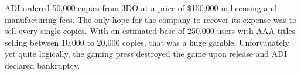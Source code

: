 ADI ordered 50,000 copies from 3DO at a price of \$150,000 in licensing and manufacturing fees. The only hope for the company to recover its expense was to sell every single copies. With an estimated base of 250,000 users with AAA titles selling between 10,000 to 20,000 copies, that was a huge gamble. Unfortunately yet quite logically, the gaming press destroyed the game upon release and ADI declared bankruptcy.\\
\par
{}\\
\par




